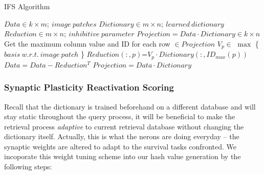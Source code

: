 \documentclass[letterpaper]{article}
\begin{document}
\begin{algorithm}[h]
  \caption{IFS Algorithm}
  \begin{algorithmic}[1]
  	
    \State $Data  \in k \times m;\ image\ patches  $
    \State $Dictionary \in m \times n;\ learned\ dictionary$
   	\State $Reduction \in m\times n;\ inhibitive\ parameter$
    \State $Projection = Data\cdot Dictionary \in k \times n$    
    	\State Get the maximum column value and ID for each row	$\in Projection$
    	 	\State $V_p \in$ $\max$ \{ $basis\ w.r.t.\ image\ patch$ \}
    	 	\State $Reduction(:,p)$=$V_p\cdot Dictionary( : , ID_{max}(p))$
         \EndFor
         \State $Data=Data - Reduction^T$
         \State $Projection = Data\cdot Dictionary$
    \EndFor 

  \end{algorithmic}
\end{algorithm}


\subsubsection{Synaptic Plasticity Reactivation Scoring}
Recall that the dictionary is trained beforehand on a different database and will stay static throughout the query process, it will be beneficial to make the retrieval process \emph{adaptive} to current retrieval database without changing the dictionary itself. Actually, this is what the nerons are doing everyday -- the synaptic weights are altered to adapt to the survival tasks confronted. We incoporate this weight tuning scheme into our hash value generation by the following steps:
\end{document}
